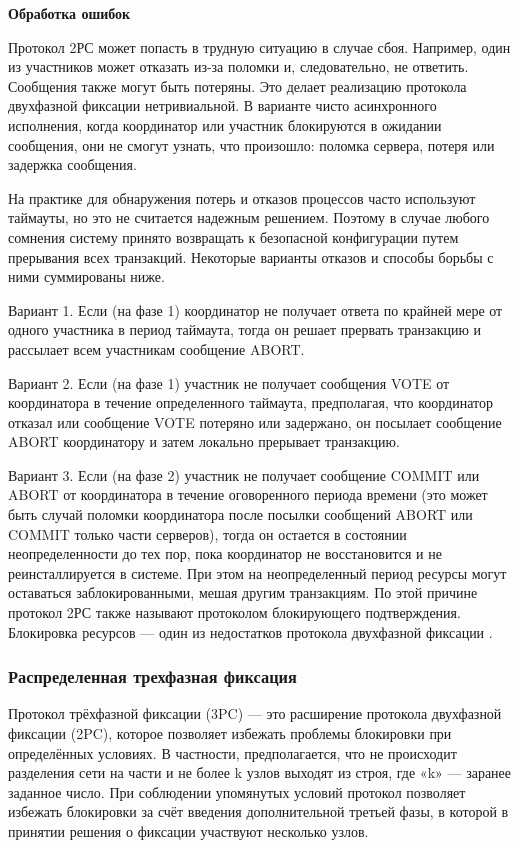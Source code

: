 \textbf{Обработка ошибок}

Протокол 2РС может попасть в трудную ситуацию в случае сбоя. Например, один из участников может отказать из-за поломки и, следовательно, не ответить. 
Сообщения также могут быть потеряны. Это делает реализацию протокола двухфазной фиксации нетривиальной. В варианте чисто асинхронного исполнения, 
когда координатор или участник блокируются в ожидании сообщения, они не смогут узнать, что произошло: поломка сервера, потеря или задержка сообщения. 

На практике для обнаружения потерь и отказов процессов часто используют таймауты, но это не считается надежным решением. Поэтому в случае любого сомнения 
систему принято возвращать к безопасной конфигурации путем прерывания всех транзакций. Некоторые варианты отказов и способы борьбы с ними суммированы ниже.

Вариант 1. Если (на фазе 1) координатор не получает ответа по крайней мере от одного участника в период таймаута, тогда он решает прервать транзакцию и 
рассылает всем участникам сообщение ABORT.

Вариант 2. Если (на фазе 1) участник не получает сообщения VOTE от координатора в течение определенного таймаута, предполагая, что координатор отказал или 
сообщение VOTE потеряно или задержано, он посылает сообщение ABORT координатору и затем локально прерывает транзакцию.

Вариант 3. Если (на фазе 2) участник не получает сообщение COMMIT или ABORT от координатора в течение оговоренного периода времени (это может быть случай 
поломки координатора после посылки сообщений ABORT или COMMIT только части серверов), тогда он остается в состоянии неопределенности до тех пор, пока 
координатор не восстановится и не реинсталлируется в системе. При этом на неопределенный период ресурсы могут оставаться заблокированными, мешая другим 
транзакциям. По этой причине протокол 2РС также называют протоколом блокирующего подтверждения. Блокировка ресурсов — один из недостатков протокола 
двухфазной фиксации \autocite{Fix}.

\subsubsection{Распределенная трехфазная фиксация}

Протокол трёхфазной фиксации (3PC) — это расширение протокола двухфазной фиксации (2PC), которое позволяет избежать проблемы блокировки при определённых условиях. В частности, 
предполагается, что не происходит разделения сети на части и не более k узлов выходят из строя, где «k» — заранее заданное число. При соблюдении упомянутых условий протокол позволяет 
избежать блокировки за счёт введения дополнительной третьей фазы, в которой в принятии решения о фиксации участвуют несколько узлов.

